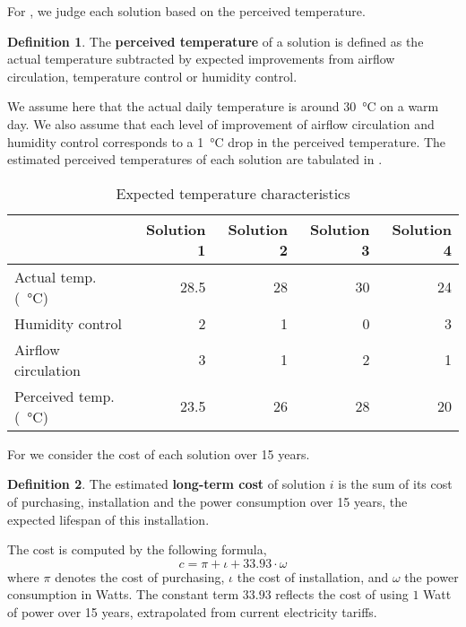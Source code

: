 \documentclass[british,a4paper,]{article}
\theoremstyle{definition}
\newtheorem{definition}{Definition}[subsection]
\begin{document}
For , we judge each solution based on the perceived temperature.
\begin{definition}
    The \textbf{perceived temperature} of a solution is defined as the actual temperature subtracted by
    expected improvements from airflow circulation, temperature control or humidity control.
\end{definition}

We assume here that the actual daily temperature is around \SI{30}{\celsius} on a warm day.
We also assume that each level of improvement of airflow circulation and humidity control corresponds to
a \SI{1}{\celsius} drop in the perceived temperature.
The estimated perceived temperatures of each solution are tabulated in .

\begin{table}[b]
\centering
\begin{tabu}{lrrrr}
    \hline\hline
                            & Solution 1 & Solution 2 & Solution 3 & Solution 4 \\ \hline
Actual temp. (\SI{}{\celsius}) & 28.5    & 28         & 30         & 24         \\
Humidity control            & 2          & 1          & 0          & 3          \\
Airflow circulation         & 3          & 1          & 2          & 1          \\
Perceived temp. (\SI{}{\celsius})& 23.5  & 26         & 28         & 20         \\
    \hline\hline
\end{tabu}
\caption{Expected temperature characteristics}
\label{tbl:comfort}
\end{table}

For  we consider the cost of each solution over 15 years.
\begin{definition}
    The estimated \textbf{long-term cost} of solution $i$ is
    the sum of its cost of purchasing, installation and the power consumption over 15 years,
    the expected lifespan of this installation.
\end{definition}

The cost is computed by the following formula,
\[ c = \pi + \iota + 33.93 \cdot \omega \]
where \(\pi\) denotes the cost of purchasing, \(\iota\) the cost of installation, and \(\omega\) the power consumption in Watts.
The constant term \(33.93\) reflects the cost of using \(1\) Watt of power over 15 years, extrapolated from current electricity tariffs.\autocite{electricity}
\end{document}
